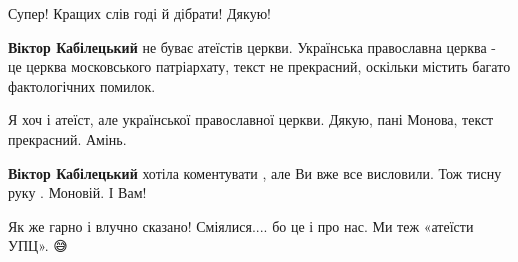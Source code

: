 \begin{itemize}
 
Супер! Кращих слів годі й дібрати! Дякую!

\begin{itemize}
 
\textbf{Віктор Кабілецький} не буває атеїстів церкви. Українська православна церква - це церква московського патріархату, текст не прекрасний, оскільки містить багато фактологічних помилок.
\end{itemize}

 
Я хоч і атеїст, але української православної церкви.
Дякую, пані Монова, текст прекрасний. Амінь.

\begin{itemize}
 
\textbf{Віктор Кабілецький} хотіла коментувати , але Ви вже все висловили. Тож тисну руку . Моновій. І Вам!

 
Як же гарно і влучно сказано! Сміялися.... бо це і про нас. Ми теж «атеїсти УПЦ». 😅

 

\end{itemize}
\end{itemize}
